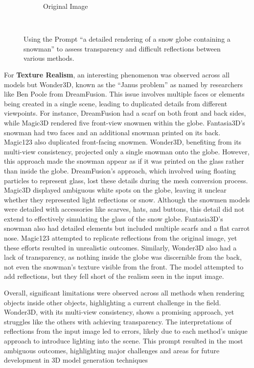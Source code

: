 \begin{figure}[ht]
\begin{subfigure}[b]{0.32\textwidth}
        \caption{Original Image}
        \vspace{0.1cm}
    \end{subfigure}
    \caption{Using the Prompt ``a detailed rendering of a snow globe containing a snowman'' to assess transparency and difficult reflections between various methods.}~\label{fig:resultGlobe}
\end{figure}

For \textbf{Texture Realism}, an interesting phenomenon was observed across all models but Wonder3D, known as the ``Janus problem'' as named by researchers like Ben Poole from DreamFusion. This issue involves multiple faces or elements being created in a single scene, leading to duplicated details from different viewpoints. For instance, DreamFusion had a scarf on both front and back sides, while Magic3D rendered five front-view snowmen within the globe. Fantasia3D's snowman had two faces and an additional snowman printed on its back. Magic123 also duplicated front-facing snowmen. Wonder3D, benefiting from its multi-view consistency, projected only a single snowman onto the globe. However, this approach made the snowman appear as if it was printed on the glass rather than inside the globe. DreamFusion's approach, which involved using floating particles to represent glass, lost these details during the mesh conversion process. Magic3D displayed ambiguous white spots on the globe, leaving it unclear whether they represented light reflections or snow. Although the snowmen models were detailed with accessories like scarves, hats, and buttons, this detail did not extend to effectively simulating the glass of the snow globe. Fantasia3D's snowman also had detailed elements but included multiple scarfs and a flat carrot nose. Magic123 attempted to replicate reflections from the original image, yet these efforts resulted in unrealistic outcomes. Similarly, Wonder3D also had a lack of transparency, as nothing inside the globe was discernible from the back, not even the snowman's texture visible from the front. The model attempted to add reflections, but they fell short of the realism seen in the input image.

Overall, significant limitations were observed across all methods when rendering objects inside other objects, highlighting a current challenge in the field. Wonder3D, with its multi-view consistency, shows a promising approach, yet struggles like the others with achieving transparency. The interpretations of reflections from the input image led to errors, likely due to each method's unique approach to introduce lighting into the scene. This prompt resulted in the most ambiguous outcomes, highlighting major challenges and areas for future development in 3D model generation techniques